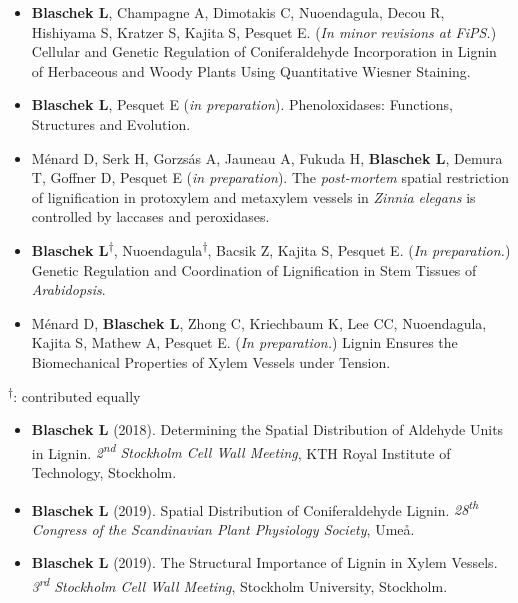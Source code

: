 \documentclass[11pt]{article}
\begin{document}
\vspace{-0.175cm}
\begin{itemize}[label={},itemindent=-9pt,leftmargin=24pt]
	\itemsep-0.1cm
	\item \textbf{Blaschek L}, Champagne A, Dimotakis C, Nuoendagula, Decou R, Hishiyama S, Kratzer S, Kajita S, Pesquet E. (\textit{In minor revisions at FiPS.}) Cellular and Genetic Regulation of Coniferaldehyde Incorporation in Lignin of Herbaceous and Woody Plants Using Quantitative Wiesner Staining. 
	\item \textbf{Blaschek L}, Pesquet E (\textit{in preparation}). Phenoloxidases: Functions, Structures and Evolution.
	\item Ménard D, Serk H, Gorzsás A, Jauneau A, Fukuda H, \textbf{Blaschek L}, Demura T, Goffner D, Pesquet E (\textit{in preparation}). The \textit{post-mortem} spatial restriction of lignification in protoxylem and metaxylem vessels in \textit{Zinnia elegans} is controlled by laccases and peroxidases.
	\item \textbf{Blaschek L}\textsuperscript{$\dagger$}, Nuoendagula\textsuperscript{$\dagger$}, Bacsik Z, Kajita S, Pesquet E. (\textit{In preparation.}) Genetic Regulation and Coordination of Lignification in Stem Tissues of \textit{Arabidopsis}.
	\item Ménard D, \textbf{Blaschek L}, Zhong C, Kriechbaum K, Lee CC, Nuoendagula, Kajita S, Mathew A, Pesquet E. (\textit{In preparation.}) Lignin Ensures the Biomechanical Properties of Xylem Vessels under Tension.
\end{itemize}

\textsuperscript{$\dagger$}: contributed equally
\vspace{0.3cm}

\vspace{-0.175cm}
\begin{itemize}[label={},itemindent=-9pt,leftmargin=24pt]
	\itemsep-0.1cm
	\item \textbf{Blaschek L} (2018). Determining the Spatial Distribution of Aldehyde Units in Lignin. \textit{2\textsuperscript{nd} Stockholm Cell Wall Meeting}, KTH Royal Institute of Technology, Stockholm.
	\item \textbf{Blaschek L} (2019). Spatial Distribution of Coniferaldehyde Lignin. \textit{28\textsuperscript{th} Congress of the Scandinavian Plant Physiology Society}, Umeå.
	\item \textbf{Blaschek L} (2019). The Structural Importance of Lignin in Xylem Vessels. \textit{3\textsuperscript{rd} Stockholm Cell Wall Meeting}, Stockholm University, Stockholm.
\end{itemize}
\vspace{0.3cm}
\end{document}
